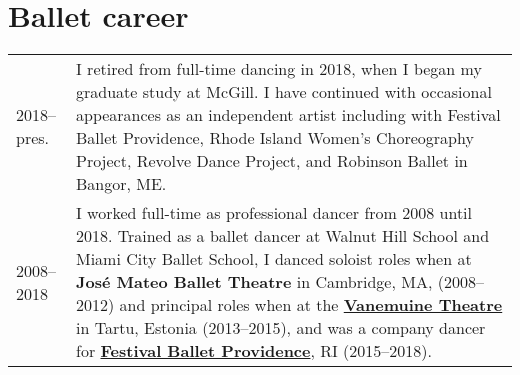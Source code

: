 \documentclass[11pt,a4paper]{article}
\begin{document}
  \section{Ballet career}
  \begin{longtable}{p{1.7cm}|p{15cm}} 2018--pres.
    &%
    I retired from full-time dancing in 2018, when I began my graduate study at
    McGill. I have continued with occasional appearances as an independent
    artist including with  Festival Ballet Providence,  Rhode Island Women's
    Choreography Project,  Revolve Dance Project,  and Robinson Ballet in
    Bangor, ME.\\
    \textsc{2008--2018}
    &%
    I worked full-time as professional dancer from 2008 until 2018. Trained as a
    ballet dancer at Walnut Hill School and Miami City Ballet School, I danced
    soloist roles when at \textbf{José Mateo Ballet Theatre} in Cambridge, MA,
    (2008--2012) and principal roles when at the
    \href{http://vanemuine.ee}{\textbf{Vanemuine Theatre}} in Tartu, Estonia
    (2013--2015), and was a company dancer for
    \href{http://festivalballetprovidence.org}{\textbf{Festival Ballet
    Providence}}, RI (2015--2018).\\
  \end{longtable}

  
\end{document}
